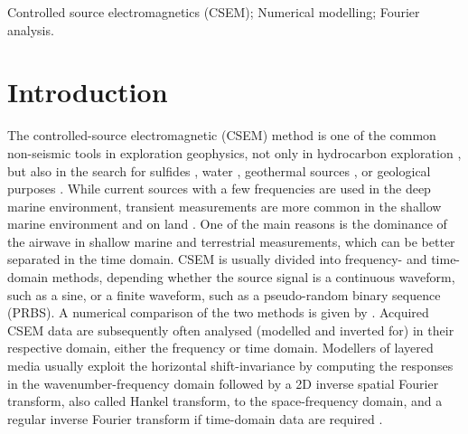 \documentclass[onecolumn,extra,referee,camera]{gji}
\begin{document}
\begin{keywords}
  Controlled source electromagnetics (CSEM); Numerical modelling; Fourier analysis.
\end{keywords}

\section{Introduction}  %

The controlled-source electromagnetic (CSEM) method is one of the common
non-seismic tools in exploration geophysics, not only in hydrocarbon
exploration \citep{GEO.10.Constable}, but also in the search for sulfides
\citep{GRL.19.Gehrmann}, water \citep{GEO.05.Pedersen}, geothermal sources
\citep{WGC.15.Girard}, or geological purposes \citep{NAT.19.Johanson}. While
current sources with a few frequencies are used in the deep marine environment,
transient measurements are more common in the shallow marine environment and on
land \citep[e.g., ][]{GEO.07.Ziolkowski, SEG.07.Andreis, SEG.07.Avdeeva}. One
of the main reasons is the dominance of the airwave in shallow marine and
terrestrial measurements, which can be better separated in the time domain.
CSEM is usually divided into frequency- and time-domain methods, depending
whether the source signal is a continuous waveform, such as a sine, or a finite
waveform, such as a pseudo-random binary sequence (PRBS). A numerical
comparison of the two methods is given by \cite{GP.13.Conell}. Acquired CSEM
data are subsequently often analysed (modelled and inverted for) in their
respective domain, either the frequency or time domain. Modellers of layered
media usually exploit the horizontal shift-invariance by computing the
responses in the wavenumber-frequency domain followed by a 2D inverse spatial
Fourier transform, also called Hankel transform, to the space-frequency domain,
and a regular inverse Fourier transform if time-domain data are required
\citep[e.g., ][]{GEO.15.Hunziker}.
\end{document}
